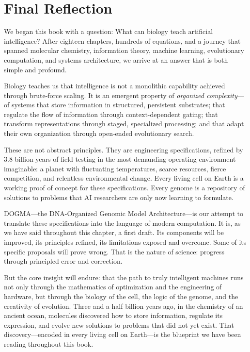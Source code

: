 \section{Final Reflection}
\label{sec:final-reflection}

\vspace{0.5em}

\noindent
We began this book with a question: What can biology teach artificial intelligence? After eighteen chapters, hundreds of equations, and a journey that spanned molecular chemistry, information theory, machine learning, evolutionary computation, and systems architecture, we arrive at an answer that is both simple and profound.

Biology teaches us that intelligence is not a monolithic capability achieved through brute-force scaling. It is an emergent property of \emph{organized complexity}---of systems that store information in structured, persistent substrates; that regulate the flow of information through context-dependent gating; that transform representations through staged, specialized processing; and that adapt their own organization through open-ended evolutionary search.

These are not abstract principles. They are engineering specifications, refined by 3.8 billion years of field testing in the most demanding operating environment imaginable: a planet with fluctuating temperatures, scarce resources, fierce competition, and relentless environmental change. Every living cell on Earth is a working proof of concept for these specifications. Every genome is a repository of solutions to problems that AI researchers are only now learning to formulate.

DOGMA---the DNA-Organized Genomic Model Architecture---is our attempt to translate these specifications into the language of modern computation. It is, as we have said throughout this chapter, a first draft. Its components will be improved, its principles refined, its limitations exposed and overcome. Some of its specific proposals will prove wrong. That is the nature of science: progress through principled error and correction.

But the core insight will endure: that the path to truly intelligent machines runs not only through the mathematics of optimization and the engineering of hardware, but through the biology of the cell, the logic of the genome, and the creativity of evolution. Three and a half billion years ago, in the chemistry of an ancient ocean, molecules discovered how to store information, regulate its expression, and evolve new solutions to problems that did not yet exist. That discovery---encoded in every living cell on Earth---is the blueprint we have been reading throughout this book.

